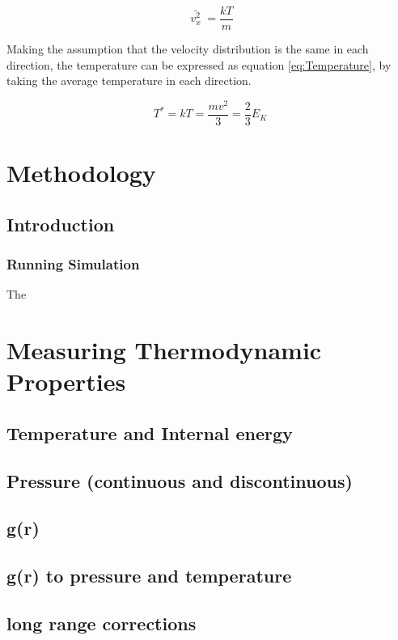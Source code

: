 \message{ !name(main.tex)}\documentclass[12pt]{UoAthesis}
\begin{document}
\begin{equation}
  \label{eq:MSV}
  \bar{\;v_x^2\;} = \frac{kT}{m}
\end{equation}

Making the assumption that the velocity distribution is the same in
each direction, the temperature can be expressed as equation
\eqref{eq:Temperature}, by taking the average temperature in each
direction. 

\begin{equation}
\label{eq:Temperature}
  T^* = kT = \frac{mv^2}{3} = \frac{2}{3}E_K
\end{equation}
\newpage

\chapter{Methodology} 
\section{Introduction} 



\subsection{Running Simulation} 
The


\chapter{Measuring Thermodynamic Properties}

\section{Temperature and Internal energy }
\section{Pressure (continuous and discontinuous)}
\section{g(r)}
\section{g(r) to pressure and temperature}
\section{long range corrections}
\end{document}
